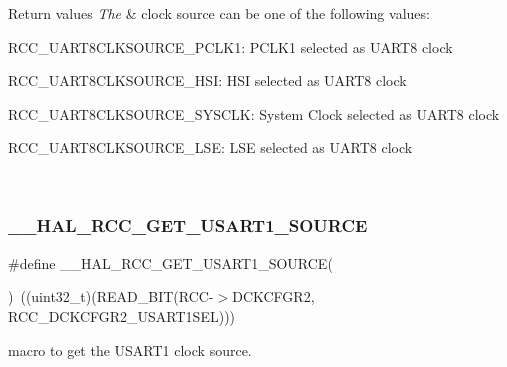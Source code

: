 \begin{DoxyRetVals}{Return values}
{\em The} & clock source can be one of the following values\+: \begin{DoxyItemize}
\item R\+C\+C\+\_\+\+U\+A\+R\+T8\+C\+L\+K\+S\+O\+U\+R\+C\+E\+\_\+\+P\+C\+L\+K1\+: P\+C\+L\+K1 selected as U\+A\+R\+T8 clock \item R\+C\+C\+\_\+\+U\+A\+R\+T8\+C\+L\+K\+S\+O\+U\+R\+C\+E\+\_\+\+H\+SI\+: H\+SI selected as U\+A\+R\+T8 clock \item R\+C\+C\+\_\+\+U\+A\+R\+T8\+C\+L\+K\+S\+O\+U\+R\+C\+E\+\_\+\+S\+Y\+S\+C\+LK\+: System Clock selected as U\+A\+R\+T8 clock \item R\+C\+C\+\_\+\+U\+A\+R\+T8\+C\+L\+K\+S\+O\+U\+R\+C\+E\+\_\+\+L\+SE\+: L\+SE selected as U\+A\+R\+T8 clock \end{DoxyItemize}
\\
\hline
\end{DoxyRetVals}
\mbox{\label{group___r_c_c_ex___exported___macros_gaf6ff545446befd6af48cd5108e8fbc2e}} 
\subsubsection{\texorpdfstring{\_\_HAL\_RCC\_GET\_USART1\_SOURCE}{\_\_HAL\_RCC\_GET\_USART1\_SOURCE}}
{\footnotesize\ttfamily \#define \+\_\+\+\_\+\+H\+A\+L\+\_\+\+R\+C\+C\+\_\+\+G\+E\+T\+\_\+\+U\+S\+A\+R\+T1\+\_\+\+S\+O\+U\+R\+CE(\begin{DoxyParamCaption}{ }\end{DoxyParamCaption})~((uint32\+\_\+t)(R\+E\+A\+D\+\_\+\+B\+IT(R\+CC-\/$>$D\+C\+K\+C\+F\+G\+R2, R\+C\+C\+\_\+\+D\+C\+K\+C\+F\+G\+R2\+\_\+\+U\+S\+A\+R\+T1\+S\+EL)))}



macro to get the U\+S\+A\+R\+T1 clock source. 



